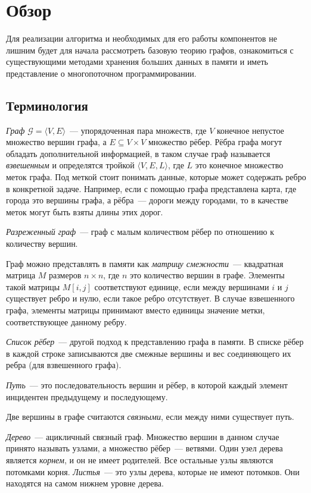 
\section{Обзор}
\label{sec:relatedworks}
Для реализации алгоритма и необходимых для его работы компонентов не лишним будет для начала рассмотреть базовую теорию графов, ознакомиться с существующими методами хранения больших данных в памяти и иметь представление о многопоточном программировании.

\subsection{Терминология}
\textit{Граф} $\mathcal{G} = \langle V, E \rangle$~--- упорядоченная пара множеств, где $V$ конечное непустое множество вершин графа, а $E \subseteq V \times V$ множество рёбер. Рёбра графа могут обладать дополнительной информацией, в таком случае граф называется \textit{взвешенным} и определятся тройкой $\langle V, E, L \rangle$, где $L$ это конечное множество меток графа. Под меткой стоит понимать данные, которые может содержать ребро в конкретной задаче. Например, если с помощью графа представлена карта, где города это вершины графа, а рёбра~--- дороги между городами, то в качестве меток могут быть взяты длины этих дорог.

\textit{Разреженный граф}~--- граф с малым количеством рёбер по отношению к количеству вершин.

Граф можно представлять в памяти как \textit{матрицу смежности}~--- квадратная матрица $M$ размеров $n \times n$, где $n$ это количество вершин в графе. Элементы такой матрицы $M[i,j]$ соответствуют единице, если между вершинами $i$ и $j$ существует ребро и нулю, если такое ребро отсутствует. В случае взвешенного графа, элементы матрицы принимают вместо единицы значение метки, соответствующее данному ребру.

\textit{Список рёбер}~--- другой подход к представлению графа в памяти. В списке рёбер в каждой строке записываются две смежные вершины и вес соединяющего 
их ребра (для взвешенного графа).

\textit{Путь}~--- это последовательность вершин и рёбер, в которой каждый элемент инцидентен предыдущему и последующему.

Две вершины в графе считаются \textit{связными}, если между ними существует путь.

\textit{Дерево}~---  ацикличный связный граф. Множество вершин в данном случае принято называть узлами, а множество рёбер~--- ветвями. Один узел дерева является \textit{корнем}, и он не имеет родителей. Все остальные узлы являются потомками корня. \textit{Листья}~--- это узлы дерева, которые не имеют потомков. Они находятся на самом нижнем уровне дерева.

